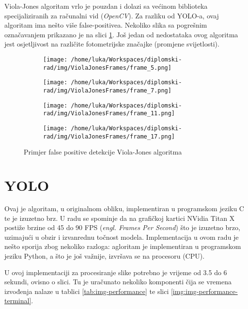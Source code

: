 Viola-Jones algoritam vrlo je pouzdan i dolazi sa većinom biblioteka specijaliziranih za računalni vid (\textit{OpenCV}). Za razliku od YOLO-a, ovaj algoritam ima nešto više false-positivea. Nekoliko slika sa pogrešnim označavanjem prikazano je na slici \ref{img:violaJones-fp}. Još jedan od nedostataka ovog algoritma jest osjetljivost na različite fotometrijske značajke (promjene svijetlosti). 

\begin{figure}[htp]
	\centering
	\begin{subfigure}[b]{0.4\linewidth}
		\texttt{[image: /home/luka/Workspaces/diplomski-rad/img/ViolaJonesFrames/frame\_5.png]}
	\end{subfigure}
	\begin{subfigure}[b]{0.4\linewidth}
		\texttt{[image: /home/luka/Workspaces/diplomski-rad/img/ViolaJonesFrames/frame\_7.png]}
	\end{subfigure}
	\begin{subfigure}[b]{0.4\linewidth}
		\texttt{[image: /home/luka/Workspaces/diplomski-rad/img/ViolaJonesFrames/frame\_11.png]}
	\end{subfigure}
	\begin{subfigure}[b]{0.4\linewidth}
		\texttt{[image: /home/luka/Workspaces/diplomski-rad/img/ViolaJonesFrames/frame\_17.png]}
	\end{subfigure}
	\caption{Primjer false positive detekcije Viola-Jones algoritma}
	\label{img:violaJones-fp}
\end{figure}

\section{YOLO}

Ovaj je algoritam, u originalnom obliku, implementiran u programskom jeziku C te je izuzetno brz. U radu se spominje da na grafičkoj kartici NVidia Titan X postiže brzine od 45 do 90 FPS (\textit{engl. Frames Per Second}) što je izuzetno brzo, uzimajući u obzir i izvanrednu točnost modela. Implementacija u ovom radu je nešto sporija zbog nekoliko razloga: agloritam je implementiran u programskom jeziku Python, a što je još važnije, izvršava se na procesoru (CPU).

U ovoj implementaciji za procesiranje slike potrebno je vrijeme od 3.5 do 6 sekundi, ovisno o slici. Tu je uračunato nekoliko komponenti čija se vremena izvođenja nalaze u tablici \ref{tab:img-performance} te slici \ref{img:img-performance-terminal}.

